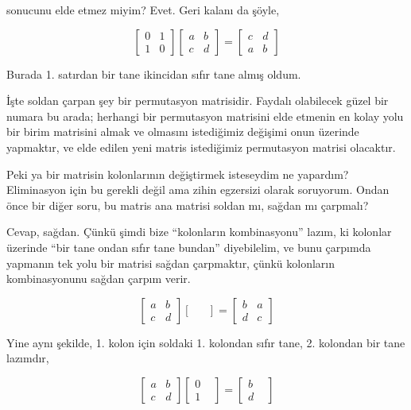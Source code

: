 \documentclass[12pt,fleqn]{article}\usepackage{../../common}
\begin{document}
sonucunu elde etmez miyim? Evet. Geri kalanı da şöyle,

$$ 
\left[\begin{array}{rr}
0 & 1 \\
1 & 0
\end{array}\right]
\left[\begin{array}{rr}
a & b \\
c & d
\end{array}\right]
=
\left[\begin{array}{rr}
c & d \\
a & b
\end{array}\right]
 $$

Burada 1. satırdan bir tane ikincidan sıfır tane almış oldum.

İşte soldan çarpan şey bir permutasyon matrisidir. Faydalı olabilecek güzel
bir numara bu arada; herhangi bir permutasyon matrisini elde etmenin en
kolay yolu bir birim matrisini almak ve olmasını istediğimiz değişimi onun
üzerinde yapmaktır, ve elde edilen yeni matris istediğimiz permutasyon
matrisi olacaktır.

Peki ya bir matrisin kolonlarının değiştirmek isteseydim ne yapardım?
Eliminasyon için bu gerekli değil ama zihin egzersizi olarak
soruyorum. Ondan önce bir diğer soru, bu matris ana matrisi soldan mı,
sağdan mı çarpmalı?

Cevap, sağdan. Çünkü şimdi bize ``kolonların kombinasyonu'' lazım, ki
kolonlar üzerinde ``bir tane ondan sıfır tane bundan'' diyebilelim, ve bunu
çarpımda yapmanın tek yolu bir matrisi sağdan çarpmaktır, çünkü kolonların
kombinasyonunu sağdan çarpım verir. 

$$ 
\left[\begin{array}{rr}
a & b \\
c & d
\end{array}\right]
\left[\begin{array}{rr}
 &  \\
 & 
\end{array}\right]
=
\left[\begin{array}{rr}
b & a \\
d & c
\end{array}\right]
 $$

Yine aynı şekilde, 1. kolon için soldaki 1. kolondan sıfır tane,
2. kolondan bir tane lazımdır, 

$$ 
\left[\begin{array}{rr}
a & b \\
c & d
\end{array}\right]
\left[\begin{array}{rr}
0 &  \\
1 & 
\end{array}\right]
=
\left[\begin{array}{rr}
b &  \\
d & 
\end{array}\right]
 $$
\end{document}
